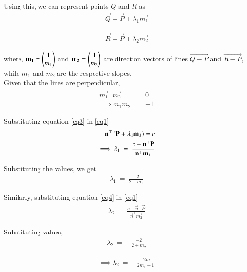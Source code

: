 \documentclass[journal]{IEEEtran}
\begin{document}
Using this, we can represent points $Q$ and $R$ as
\begin{align}
    \vec{Q} = \vec{P} + \lambda_1\vec{m_1}\label{eq3}
\end{align}

\begin{align}
    \vec{R} = \vec{P} + \lambda_2\vec{m_2} \label{eq4}
\end{align}

where, $\mathbf{m_1} = \begin{pmatrix}1\\m_1\end{pmatrix}$ and $\mathbf{m_2} = \begin{pmatrix}1\\m_2\end{pmatrix}$ are direction vectors of lines $\vec{Q-P}$ and $\vec{R-P}$, while $m_1$ and $m_2$ are the respective slopes.\\

Given that the lines are perpendicular, 
\begin{align}
    \vec{m_1}^\top\vec{m_2} =& 0\\
    \implies m_1m_2 =& -1
\end{align}

Substituting equation \eqref{eq3} in \eqref{eq1}
\begin{align}
    \vec{n}^\top\brak{\vec{P} + \lambda_1\vec{m_1}} = c\\
    \implies \lambda_1 \ = \ \frac{c-\vec{n}^\top\vec{P}}{\vec{n}^\top\vec{m_1}}
\end{align}

Substituting the values, we get
\begin{align}
    \lambda_1 \ = \ \frac{-2}{2+m_1} \label{eq9}
\end{align}

Similarly, substituting equation \eqref{eq4} in \eqref{eq1}
\begin{align}
    \lambda_2 \ = \ \frac{c-\vec{n}^\top\vec{P}}{\vec{n}^\top\vec{m_2}}
\end{align}

Substituting values,
\begin{align}
    \lambda_2 \ =&\ \frac{-2}{2+m_2}
\end{align}

\begin{align}
    \implies \lambda_2 \ =& \ \frac{-2m_1}{2m_1-1} \label{eq12}
\end{align}\\
\end{document}
